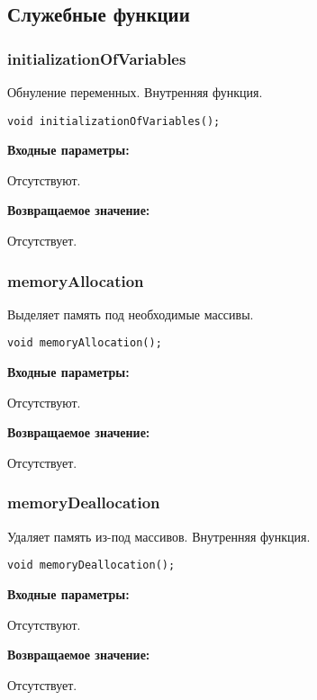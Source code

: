 \documentclass[a4paper,12pt]{article}
\begin{document}
\subsection{Служебные функции}

\subsubsection{initializationOfVariables}\label{initializationOfVariables}

Обнуление переменных. Внутренняя функция.


\begin{lstlisting}[label=code_syntax_initializationOfVariables,caption=Синтаксис]
void initializationOfVariables();
\end{lstlisting}

\textbf{Входные параметры:}

Отсутствуют.

\textbf{Возвращаемое значение:}

Отсутствует.


\subsubsection{memoryAllocation}\label{memoryAllocation}

Выделяет память под необходимые массивы.


\begin{lstlisting}[label=code_syntax_memoryAllocation,caption=Синтаксис]
void memoryAllocation();
\end{lstlisting}

\textbf{Входные параметры:}

Отсутствуют.

\textbf{Возвращаемое значение:}

Отсутствует.


\subsubsection{memoryDeallocation}\label{memoryDeallocation}

Удаляет память из-под массивов. Внутренняя функция.


\begin{lstlisting}[label=code_syntax_memoryDeallocation,caption=Синтаксис]
void memoryDeallocation();
\end{lstlisting}

\textbf{Входные параметры:}

Отсутствуют.

\textbf{Возвращаемое значение:}

Отсутствует.


\end{document}
